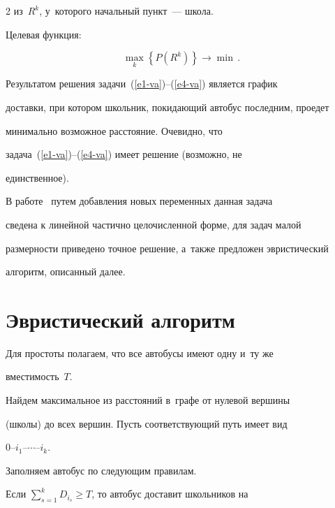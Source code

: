 \begin{multicols}{2}
из~$R^k$, у~которого начальный пункт~--- школа.



     Целевая функция:

     \begin{equation}

     \max\limits_k \left\{ P(R^k)\right\}\to \min\,.

     \label{e4-va}

     \end{equation}



     Результатом решения задачи~(\ref{e1-va})--(\ref{e4-va}) является график

доставки, при котором школьник, покидающий автобус последним, проедет

минимально возможное расстояние. Очевидно, что

     задача~(\ref{e1-va})--(\ref{e4-va}) имеет решение (возможно, не

единственное).



В работе~\cite{3-va} путем добавления новых переменных данная задача

сведена к линейной частично целочисленной форме, для задач малой

раз\-мер\-ности приведено точное решение, а~также предложен эвристический

алгоритм, описанный далее.



\section{Эвристический алгоритм}



     Для простоты полагаем, что все автобусы имеют одну и~ту же

вместимость~$T$.



     Найдем максимальное из расстояний в~графе от нулевой вершины

(школы) до всех вершин. Пусть соответствующий путь имеет вид

     0--$i_1$--$\cdots$--$i_k$.



Заполняем автобус по следующим правилам.



     Если $\sum\nolimits_{s=1}^k D_{i_s} \geq T$, то автобус доставит школьников на


\end{multicols}
